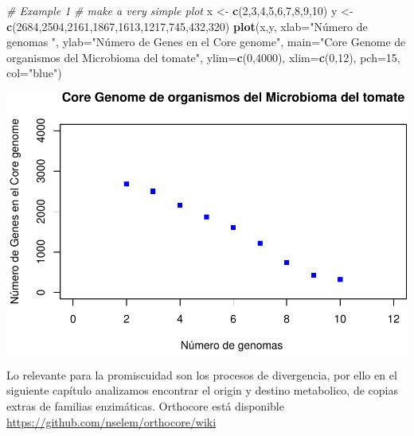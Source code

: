 \documentclass[]{article}
\newenvironment{Shaded}{\begin{snugshade}}{\end{snugshade}}
\newcommand{\KeywordTok}[1]{\textcolor[rgb]{0.13,0.29,0.53}{\textbf{{#1}}}}
\newcommand{\DataTypeTok}[1]{\textcolor[rgb]{0.13,0.29,0.53}{{#1}}}
\newcommand{\DecValTok}[1]{\textcolor[rgb]{0.00,0.00,0.81}{{#1}}}
\newcommand{\StringTok}[1]{\textcolor[rgb]{0.31,0.60,0.02}{{#1}}}
\newcommand{\CommentTok}[1]{\textcolor[rgb]{0.56,0.35,0.01}{\textit{{#1}}}}
\newcommand{\NormalTok}[1]{{#1}}
\begin{document}
\begin{Shaded}
\begin{Highlighting}[]
\CommentTok{# Example 1}
\CommentTok{# make a very simple plot}
\NormalTok{x <-}\StringTok{ }\KeywordTok{c}\NormalTok{(}\DecValTok{2}\NormalTok{,}\DecValTok{3}\NormalTok{,}\DecValTok{4}\NormalTok{,}\DecValTok{5}\NormalTok{,}\DecValTok{6}\NormalTok{,}\DecValTok{7}\NormalTok{,}\DecValTok{8}\NormalTok{,}\DecValTok{9}\NormalTok{,}\DecValTok{10}\NormalTok{)}
\NormalTok{y <-}\StringTok{ }\KeywordTok{c}\NormalTok{(}\DecValTok{2684}\NormalTok{,}\DecValTok{2504}\NormalTok{,}\DecValTok{2161}\NormalTok{,}\DecValTok{1867}\NormalTok{,}\DecValTok{1613}\NormalTok{,}\DecValTok{1217}\NormalTok{,}\DecValTok{745}\NormalTok{,}\DecValTok{432}\NormalTok{,}\DecValTok{320}\NormalTok{)}
 \KeywordTok{plot}\NormalTok{(x,y, }\DataTypeTok{xlab=}\StringTok{"Número de genomas "}\NormalTok{, }\DataTypeTok{ylab=}\StringTok{"Número de Genes en el Core genome"}\NormalTok{, }\DataTypeTok{main=}\StringTok{"Core Genome de organismos del Microbioma del tomate"}\NormalTok{, }\DataTypeTok{ylim=}\KeywordTok{c}\NormalTok{(}\DecValTok{0}\NormalTok{,}\DecValTok{4000}\NormalTok{), }\DataTypeTok{xlim=}\KeywordTok{c}\NormalTok{(}\DecValTok{0}\NormalTok{,}\DecValTok{12}\NormalTok{), }\DataTypeTok{pch=}\DecValTok{15}\NormalTok{, }\DataTypeTok{col=}\StringTok{"blue"}\NormalTok{) }
\end{Highlighting}
\end{Shaded}

\includegraphics{chap1_files/figure-latex/unnamed-chunk-1-1.pdf}

Lo relevante para la promiscuidad son los procesos de divergencia, por
ello en el siguiente capítulo analizamos encontrar el origin y destino
metabolico, de copias extras de familias enzimáticas. Orthocore está
disponible \url{https://github.com/nselem/orthocore/wiki}
\end{document}
